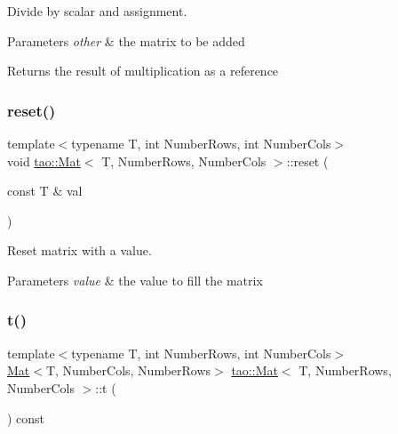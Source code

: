 Divide by scalar and assignment. 


\begin{DoxyParams}{Parameters}
{\em other} & the matrix to be added \\
\hline
\end{DoxyParams}
\begin{DoxyReturn}{Returns}
the result of multiplication as a reference 
\end{DoxyReturn}
\mbox{\label{classtao_1_1_mat_a6f501dafd8e5fec2d40d036fe8faeb47}} 
\subsubsection{\texorpdfstring{reset()}{reset()}}
{\footnotesize\ttfamily template$<$typename T, int Number\+Rows, int Number\+Cols$>$ \\
void \mbox{\hyperlink{classtao_1_1_mat}{tao\+::\+Mat}}$<$ T, Number\+Rows, Number\+Cols $>$\+::reset (\begin{DoxyParamCaption}\item[{const T \&}]{val }\end{DoxyParamCaption})\hspace{0.3cm}{\ttfamily [inline]}}



Reset matrix with a value. 


\begin{DoxyParams}{Parameters}
{\em value} & the value to fill the matrix \\
\hline
\end{DoxyParams}
\mbox{\label{classtao_1_1_mat_aa1c457eab2e6abb72ebf865c8284ed7c}} 
\subsubsection{\texorpdfstring{t()}{t()}}
{\footnotesize\ttfamily template$<$typename T, int Number\+Rows, int Number\+Cols$>$ \\
\mbox{\hyperlink{classtao_1_1_mat}{Mat}}$<$T, Number\+Cols, Number\+Rows$>$ \mbox{\hyperlink{classtao_1_1_mat}{tao\+::\+Mat}}$<$ T, Number\+Rows, Number\+Cols $>$\+::t (\begin{DoxyParamCaption}{ }\end{DoxyParamCaption}) const\hspace{0.3cm}{\ttfamily [inline]}}



